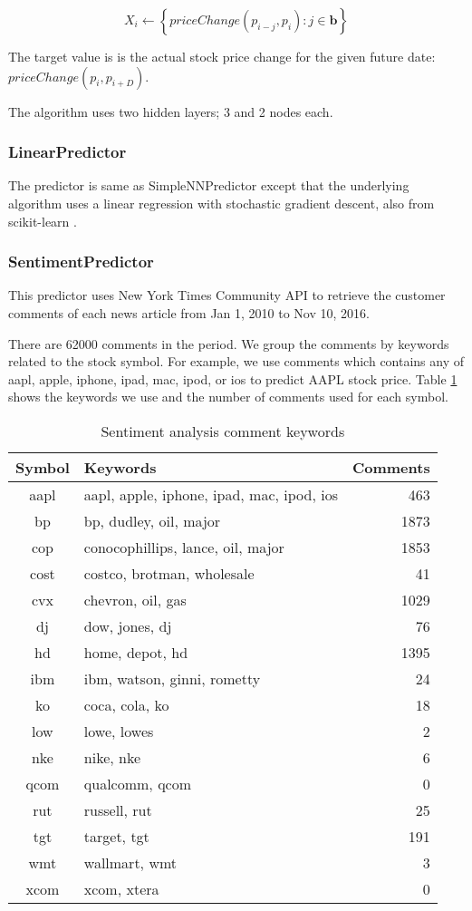 \documentclass[twocolumn,10pt]{asme2ej}
\newcommand{\vect}[1]{\boldsymbol{#1}}
\begin{document}
\[
X_i \gets \left\{priceChange(p_{i - j}, p_i) : j \in \vect{b}\right\}
\]

The target value is is the actual stock price change for the given
future date: $priceChange(p_i, p_{i+D})$.

The algorithm uses two hidden layers; 3 and 2 nodes each.

\subsubsection{LinearPredictor}
The predictor is same as SimpleNNPredictor except that the underlying
algorithm uses a linear regression with stochastic gradient descent,
also from scikit-learn \cite{web:scikit_learn}.

\subsubsection{SentimentPredictor}

This predictor uses New York Times Community API
\cite{web:nytimes_community_api} to retrieve the customer comments of
each news article from Jan 1, 2010 to Nov 10, 2016.

There are 62000 comments in the period. We group the comments by
keywords related to the stock symbol. For example, we use comments
which contains any of aapl, apple, iphone, ipad, mac, ipod, or ios to
predict AAPL stock price. Table \ref{sentiment_keywords} shows the
keywords we use and the number of comments used for each symbol.


\begin{table}
  \begin{tabular}{clr}
    Symbol & Keywords & Comments \\
    \hline
    aapl & aapl, apple, iphone, ipad, mac, ipod, ios & 463 \\
    bp & bp, dudley, oil, major & 1873 \\
    cop & conocophillips, lance, oil, major & 1853 \\
    cost & costco, brotman, wholesale & 41 \\
    cvx & chevron, oil, gas & 1029 \\
    dj & dow, jones, dj & 76 \\
    hd & home, depot, hd & 1395 \\
    ibm & ibm, watson, ginni, rometty & 24 \\
    ko & coca, cola, ko & 18 \\
    low & lowe, lowes & 2 \\
    nke & nike, nke & 6 \\
    qcom & qualcomm, qcom & 0 \\
    rut & russell, rut & 25 \\
    tgt & target, tgt & 191 \\
    wmt & wallmart, wmt & 3 \\
    xcom & xcom, xtera & 0 \\
  \end{tabular}
  \caption{Sentiment analysis comment keywords}
  \label{sentiment_keywords}
\end{table}
\end{document}
